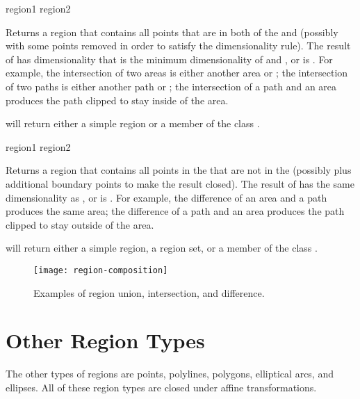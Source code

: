 \MayCaptureInputs

 {region1 region2}

Returns a region that contains all points that are in both of the 
 and  (possibly with some points removed in order to
satisfy the dimensionality rule).  The result of  has
dimensionality that is the minimum dimensionality of  and
, or is .  For example, the intersection of two areas
is either another area or ; the intersection of two paths is
either another path or ; the intersection of a path and an area
produces the path clipped to stay inside of the area.

 will return either a simple region or a member of the
class .

\MayCaptureInputs

 {region1 region2}

Returns a region that contains all points in the  
that are not in the   (possibly plus additional
boundary points to make the result closed).  The result of
 has the same dimensionality as , or is
.  For example, the difference of an area and a path produces the
same area; the difference of a path and an area produces the path clipped to
stay outside of the area.

 will return either a simple region, a region set, or a
member of the class .

\MayCaptureInputs


\begin{figure}
\centerline{\texttt{[image: region-composition]}}
\caption{Examples of region union, intersection, and difference.}
\end{figure}


\section {Other Region Types}

The other types of regions are points, polylines, polygons, elliptical arcs, and
ellipses.  All of these region types are closed under affine transformations.

